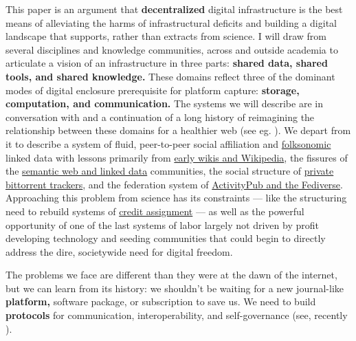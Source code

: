 This paper is an argument that \textbf{decentralized} digital
infrastructure is
the best means of alleviating the harms of infrastructural deficits and
building a digital landscape that supports, rather than extracts from
science. I will draw from several disciplines and knowledge communities,
across and outside academia to articulate a vision of an infrastructure
in three parts: \textbf{shared data, shared tools, and shared
knowledge.} These domains reflect three of the dominant modes of digital
enclosure prerequisite for platform capture: \textbf{storage,
computation, and communication.} The systems we will describe are in
conversation with and a continuation of a long history of reimagining
the relationship between these domains for a healthier web (see eg. \citep{berners-leeSociallyAwareCloud2009, berners-leeWebServicesOverview2009} ). We depart from it to describe
a system of fluid, peer-to-peer social affiliation and
\protect\hyperlink{folk-federation}{folksonomic} linked
data with lessons primarily from \protect\hyperlink{the-wiki-way}{early
wikis and Wikipedia}, the fissures of the
\protect\hyperlink{neatness-vs-scruffiness}{semantic web and linked
data} communities, the social structure of
\protect\hyperlink{archives-need-communities}{private bittorrent
trackers}, and the federation system of
\protect\hyperlink{forums--feeds}{ActivityPub and the Fediverse}.
Approaching this problem from science has its constraints --- like the
structuring need to rebuild systems of
\protect\hyperlink{credit-assignment}{credit assignment} --- as well as
the powerful opportunity of one of the last systems of labor largely not
driven by profit developing technology and seeding communities that
could begin to directly address the dire, societywide need for digital
freedom.

The problems we face are different than they were at the dawn of the
internet, but we can learn from its history: we shouldn't be waiting for
a new journal-like \textbf{platform,} software package, or subscription
to save us. We need to build \textbf{protocols} for communication,
interoperability, and self-governance (see, recently \citep{brembsReplacingAcademicJournals2021} ).

